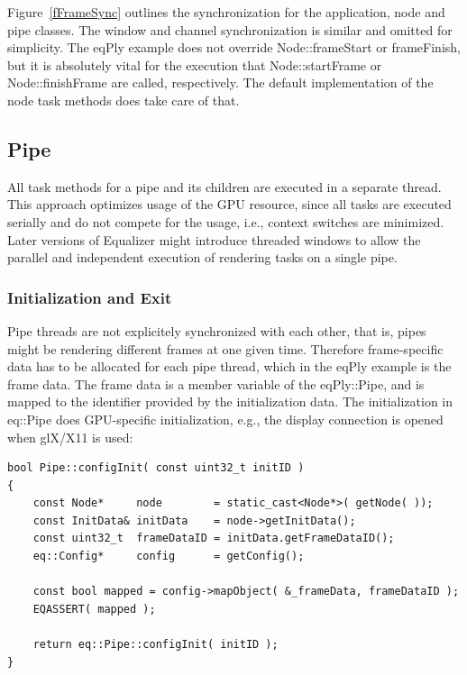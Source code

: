 \documentclass[10pt,a4]{scrartcl}
\newcommand{\fig}[1]{Figure~\ref{#1}}
\begin{document}
\fig{fFrameSync} outlines the synchronization for the application, node
and pipe classes. The window and channel synchronization is similar and
omitted for simplicity. The \textsf{eqPly} example does not override
\textsf{Node::frameStart} or \textsf{frameFinish}, but it is absolutely
vital for the execution that \textsf{Node::startFrame} or
\textsf{Node::finishFrame} are called, respectively. The default
implementation of the node task methods does take care of that.

\subsection{Pipe}

All task methods for a pipe and its children are executed in a separate
thread. This approach optimizes usage of the GPU resource, since all
tasks are executed serially and do not compete for the usage, i.e.,
context switches are minimized. Later versions of Equalizer might
introduce threaded windows to allow the parallel and independent
execution of rendering tasks on a single pipe.

\subsubsection{Initialization and Exit}

Pipe threads are not explicitely synchronized with each other, that is,
pipes might be rendering different frames at one given time. Therefore
frame-specific data has to be allocated for each pipe thread, which in
the \textsf{eqPly} example is the frame data. The frame data is a member
variable of the \textsf{eqPly::Pipe}, and is mapped to the identifier
provided by the initialization data. The initialization in
\textsf{eq::Pipe} does GPU-specific initialization, e.g., the display
connection is opened when glX/X11 is used:

{\footnotesize\begin{lstlisting}
bool Pipe::configInit( const uint32_t initID )
{
    const Node*     node        = static_cast<Node*>( getNode( ));
    const InitData& initData    = node->getInitData();
    const uint32_t  frameDataID = initData.getFrameDataID();
    eq::Config*     config      = getConfig();

    const bool mapped = config->mapObject( &_frameData, frameDataID );
    EQASSERT( mapped );

    return eq::Pipe::configInit( initID );
}
\end{lstlisting}}
\end{document}
